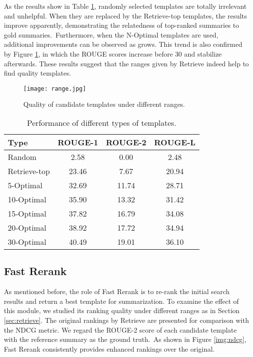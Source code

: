\documentclass[11pt,a4paper]{article}
\begin{document}
\begin{spacing}{1.0}
As the results show in Table \ref{tab:Retrieve}, randomly selected templates are totally irrelevant and unhelpful. When they are replaced by the Retrieve-top templates, the results improve apparently, demonstrating the relatedness of top-ranked summaries to gold summaries.~Furthermore, when the N-Optimal templates are used, additional improvements can be observed as  grows. This trend is also confirmed by Figure \ref{img:data}, in which the ROUGE scores increase before 30 and stabilize afterwards. These results suggest that the ranges given by Retrieve indeed help to find quality templates.

\begin{figure}
\centering
\texttt{[image: range.jpg]}
\caption{Quality of candidate templates under different ranges. }
\label{img:data}
\end{figure}

\begin{table}[h]
\small

	\centering
	\begin{tabular}{@{}l|ccc@{}}
		\toprule
        Type     & ROUGE-1   & ROUGE-2  & ROUGE-L   \\
        \hline
		Random       & 2.58 & 0.00 & 2.48 \\
		Retrieve-top      & 23.46 & 7.67 & 20.94 \\
		5\textrm{-}Optimal  & 32.69 & 11.74 & 28.71 \\
        10\textrm{-}Optimal  & 35.90 & 13.32 & 31.42 \\
        15\textrm{-}Optimal  & 37.82 & 16.79 & 34.08 \\
        20\textrm{-}Optimal  & 38.92 & 17.72 & 34.94 \\
        30\textrm{-}Optimal  & 40.49 & 19.01 & 36.10 \\
        \bottomrule
	\end{tabular}
	\caption{Performance of different types of templates.}
	\label{tab:Retrieve}
\end{table}



\subsection{Fast Rerank}\label{sec:fast rerank result}
As mentioned before, the role of Fast Rerank is to re-rank the initial search results and return a best template for summarization. To examine the effect of this module, we studied its ranking quality under different ranges as in Section \ref{sec:retrieve}. The original rankings by Retrieve are presented for comparison with the NDCG metric. We regard the ROUGE-2 score of each candidate template with the reference summary as the ground truth.~As shown in Figure \ref{img:ndcg}, Fast Rerank consistently provides enhanced rankings over the original.


\end{spacing}
\end{document}
